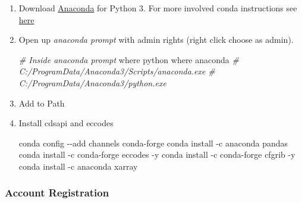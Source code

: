 \documentclass[
]{book}
\newenvironment{Shaded}{\begin{snugshade}}{\end{snugshade}}
\newcommand{\CommentTok}[1]{\textcolor[rgb]{0.56,0.35,0.01}{\textit{#1}}}
\newcommand{\ExtensionTok}[1]{#1}
\newcommand{\NormalTok}[1]{#1}
\begin{document}
\begin{enumerate}
\def\labelenumi{\arabic{enumi}.}
\item
  Download \href{https://www.anaconda.com/products/individual}{Anaconda} for Python 3. For more involved conda instructions see \href{https://fanwangecon.github.io/Tex4Econ/nontex/install/windows/fn_installations.html}{here}
\item
  Open up \emph{anaconda prompt} with admin rights (right click choose as admin).

\begin{Shaded}
\begin{Highlighting}[]
\CommentTok{\# Inside anaconda prompt}
\ExtensionTok{where}\NormalTok{ python}
\ExtensionTok{where}\NormalTok{ anaconda}
\CommentTok{\# C:/ProgramData/Anaconda3/Scripts/anaconda.exe}
\CommentTok{\# C:/ProgramData/Anaconda3/python.exe}
\end{Highlighting}
\end{Shaded}
\item
  Add to Path
\item
  Install cdsapi and eccodes

\begin{Shaded}
\begin{Highlighting}[]
\ExtensionTok{conda}\NormalTok{ config {-}{-}add channels conda{-}forge}
\ExtensionTok{conda}\NormalTok{ install {-}c anaconda pandas}
\ExtensionTok{conda}\NormalTok{ install {-}c conda{-}forge eccodes {-}y}
\ExtensionTok{conda}\NormalTok{ install {-}c conda{-}forge cfgrib {-}y}
\ExtensionTok{conda}\NormalTok{ install {-}c anaconda xarray}
\end{Highlighting}
\end{Shaded}
\end{enumerate}

\hypertarget{account-registration}{%
\subsubsection{Account Registration}\label{account-registration}}
\end{document}
